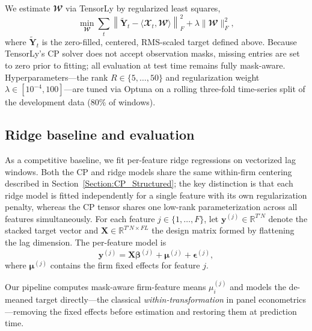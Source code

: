 \documentclass[pdflatex,sn-mathphys-num]{sn-jnl}%
\theoremstyle{thmstyleone}%
\theoremstyle{thmstyletwo}%
\theoremstyle{thmstylethree}%
\begin{document}
We estimate $\mathbfcal{W}$ via TensorLy \citep{kossaifi2019tensorly} by regularized least squares,
\begin{equation}
\min_{\mathbfcal{W}}
\sum_t \left\| \widetilde{\mathbf{Y}}_t - \langle \mathbfcal{X}_t, \mathbfcal{W} \rangle \right\|_F^2
+ \lambda \|\mathbfcal{W}\|_F^2,
\end{equation}
where $\widetilde{\mathbf{Y}}_t$ is the zero-filled, centered, RMS-scaled target defined above. Because TensorLy's CP solver does not accept observation masks, missing entries are set to zero prior to fitting; all evaluation at test time remains fully mask-aware. Hyperparameters---the rank $R \in \{5, \ldots, 50\}$ and regularization weight $\lambda \in [10^{-4}, 100]$---are tuned via Optuna on a rolling three-fold time-series split of the development data (80\% of windows).

\subsection{Ridge baseline and evaluation}
\label{Section:Baseline_Eval}

As a competitive baseline, we fit per-feature ridge regressions on vectorized lag windows. Both the CP and ridge models share the same within-firm centering described in Section~\ref{Section:CP_Structured}; the key distinction is that each ridge model is fitted independently for a single feature with its own regularization penalty, whereas the CP tensor shares one low-rank parameterization across all features simultaneously. For each feature $j \in \{1, \ldots, F\}$, let $\mathbf{y}^{(j)} \in \mathbb{R}^{T' N}$ denote the stacked target vector and $\mathbf{X} \in \mathbb{R}^{T' N \times FL}$ the design matrix formed by flattening the lag dimension. The per-feature model is
\begin{equation}
\mathbf{y}^{(j)} = \mathbf{X} \boldsymbol{\beta}^{(j)} + \boldsymbol{\mu}^{(j)} + \boldsymbol{\epsilon}^{(j)},
\end{equation}
where $\boldsymbol{\mu}^{(j)}$ contains the firm fixed effects for feature $j$.

Our pipeline computes mask-aware firm-feature means $\mu_i^{(j)}$ and models the de-meaned target directly---the classical \emph{within-transformation} in panel econometrics---removing the fixed effects before estimation and restoring them at prediction time.
\end{document}
